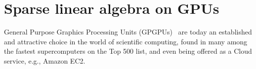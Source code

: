  \section{Sparse linear algebra on GPUs}

General Purpose Graphics Processing Units (GPGPUs)~\cite{Luebke06}  
are today an established and attractive choice 
in the world of scientific computing, found in many among the fastest
supercomputers on the Top 500 list,  and even   
being offered as %
a Cloud service, e.g.,  Amazon EC2. 
